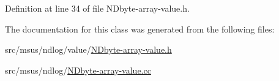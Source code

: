 Definition at line 34 of file N\-Dbyte-\/array-\/value.\-h.



The documentation for this class was generated from the following files\-:\begin{DoxyCompactItemize}
\item 
src/msus/ndlog/value/\hyperlink{_n_dbyte-array-value_8h}{N\-Dbyte-\/array-\/value.\-h}\item 
src/msus/ndlog/\hyperlink{_n_dbyte-array-value_8cc}{N\-Dbyte-\/array-\/value.\-cc}\end{DoxyCompactItemize}
